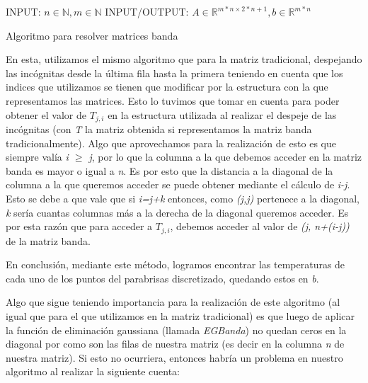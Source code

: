 \documentclass[10pt, a4paper]{article}
\begin{document}
\begin{algorithm}[H]
INPUT: $n \in \mathbb{N}, m \in \mathbb{N}$\;
INPUT/OUTPUT: $A \in \mathbb{R}^{m*n \times 2*n+1}, b \in \mathbb{R}^{m*n}$ \\
\caption{Algoritmo para resolver matrices banda}
\end{algorithm} 

En esta, utilizamos el mismo algoritmo que para la matriz tradicional, despejando las inc\'ognitas desde la \'ultima fila hasta la primera teniendo en cuenta que los indices que utilizamos se tienen que modificar por la estructura con la que representamos las matrices. Esto lo tuvimos que tomar en cuenta para poder obtener el valor de \textit{$T_{j,i}$} en la estructura utilizada al realizar el despeje de las inc\'ognitas (con \textit{T} la matriz obtenida si representamos la matriz banda tradicionalmente). Algo que aprovechamos para la realizaci\'on de esto es que siempre val\'ia \textit{i $\geq$ j}, por lo que la columna a la que debemos acceder en la matriz banda es mayor o igual a \textit{n}. Es por esto que la distancia a la diagonal de la columna a la que queremos acceder se puede obtener mediante el c\'alculo de \textit{i-j}. Esto se debe a que vale que si \textit{i=j+k} entonces, como \textit{(j,j)} pertenece a la diagonal, \textit{k} ser\'ia cuantas columnas m\'as a la derecha de la diagonal queremos acceder. Es por esta raz\'on que para acceder a \textit{$T_{j,i}$}, debemos acceder al valor de \textit{(j, n+(i-j))} de la matriz banda.

En conclusi\'on, mediante este m\'etodo, logramos encontrar las temperaturas de cada uno de los puntos del parabrisas discretizado, quedando estos en \textit{b}.

Algo que sigue teniendo importancia para la realizaci\'on de este algoritmo (al igual que para el que utilizamos en la matriz tradicional) es que luego de aplicar la funci\'on de eliminaci\'on gaussiana (llamada \textit{EGBanda}) no quedan ceros en la diagonal por como son las filas de nuestra matriz (es decir en la columna \textit{n} de nuestra matriz). 
Si esto no ocurriera, entonces habr\'ia un problema en nuestro algoritmo al realizar la siguiente cuenta:
\end{document}
